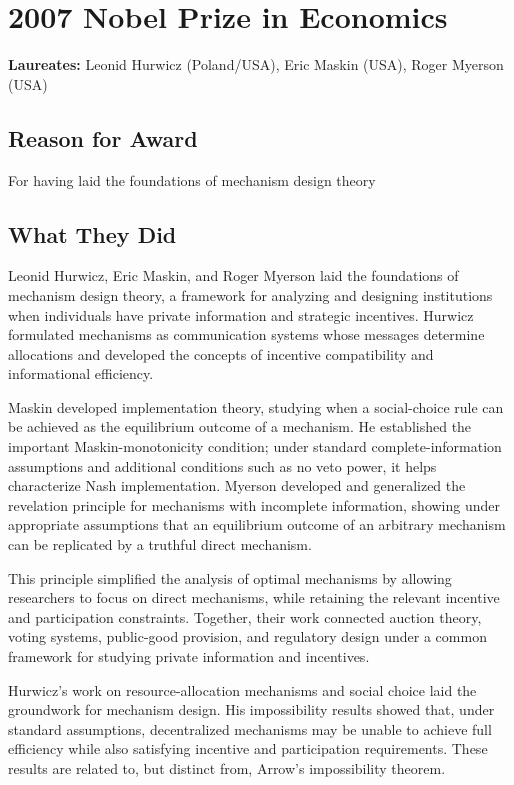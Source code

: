 \chapter{2007 Nobel Prize in Economics}
\textbf{Laureates: }Leonid Hurwicz (Poland/USA), Eric Maskin (USA), Roger Myerson (USA)

\section*{Reason for Award}
For having laid the foundations of mechanism design theory

\section{What They Did}
Leonid Hurwicz, Eric Maskin, and Roger Myerson laid the foundations of mechanism
design theory, a framework for analyzing and designing institutions when
individuals have private information and strategic incentives. Hurwicz formulated
mechanisms as communication systems whose messages determine allocations and
developed the concepts of incentive compatibility and informational efficiency.

Maskin developed implementation theory, studying when a social-choice rule can be
achieved as the equilibrium outcome of a mechanism. He established the important
Maskin-monotonicity condition; under standard complete-information assumptions
and additional conditions such as no veto power, it helps characterize Nash
implementation. Myerson developed and generalized the revelation principle for
mechanisms with incomplete information, showing under appropriate assumptions
that an equilibrium outcome of an arbitrary mechanism can be replicated by a
truthful direct mechanism.

This principle simplified the analysis of optimal mechanisms by allowing
researchers to focus on direct mechanisms, while retaining the relevant
incentive and participation constraints. Together, their work connected auction
theory, voting systems, public-good provision, and regulatory design under a
common framework for studying private information and incentives.

Hurwicz's work on resource-allocation mechanisms and social choice laid the
groundwork for mechanism design. His impossibility results showed that, under
standard assumptions, decentralized mechanisms may be unable to achieve full
efficiency while also satisfying incentive and participation requirements. These
results are related to, but distinct from, Arrow's impossibility theorem.

